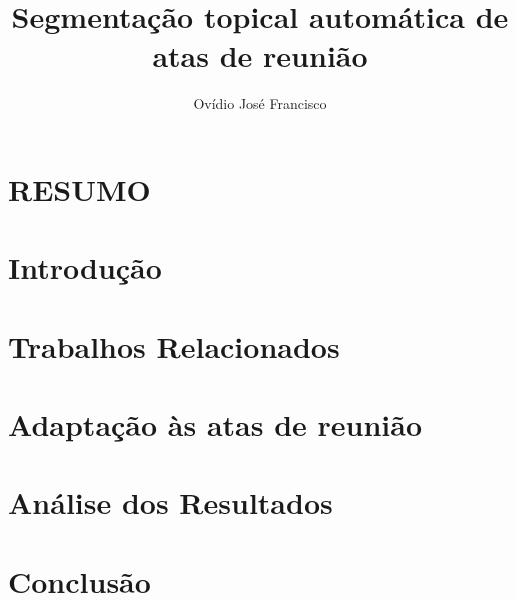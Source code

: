 \documentclass{sig-alternate-05-2015}
\begin{document}
\title{Segmentação topical automática de atas de reunião}



\author{
\alignauthor Ovídio José Francisco\\
}

\maketitle

%

\section*{RESUMO}



\keywords{}

\begingroup
\let\clearpage\relax

\section{Introdução}
	\label{sec:introducao}
	

\section{Trabalhos Relacionados}
	\label{sec:trabalhos}
	

\section{Adaptação às atas de reunião}
	\label{sec:adaptacaoasatas}
		
	
\section{Análise dos Resultados}
	\label{sec:resultados}
	
	
\section{Conclusão}
	\label{sec:conclusao}
	
\endgroup




	
\pagestyle{empty}
 	\label{sec:anexo}
 	
\end{document}
